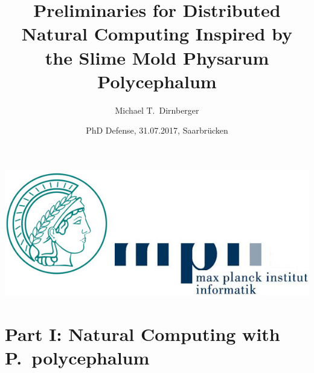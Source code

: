 \documentclass[	hyperref={pdfpagelabels=false}, xcolor=dvipsnames,
		11pt]{beamer}
\title{Preliminaries for Distributed Natural Computing Inspired by the Slime Mold Physarum Polycephalum}
\author{Michael T.\ Dirnberger}
\institute{Max Planck Institute for Informatics}
\date{PhD Defense, 31.07.2017, Saarbr\"ucken\\[2em]}
\begin{document}
\begin{frame}[plain]

\titlepage
\vspace{-1cm}
	    \begin{center}
		\includegraphics[width=0.3\linewidth]{./pics/mpilogo}
	    \end{center}
\end{frame} 

\section{Part I: Natural Computing with P.~polycephalum}
\end{document}
